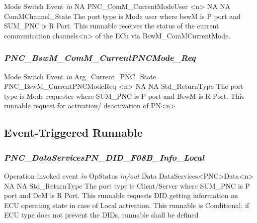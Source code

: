 {Mode Switch Event}
{ \textit{in} \hspace*{1.5in} \vrule \hspace*{0.1in} NA}
{PNC_ComM_CurrentModeUser <n>}
{NA}
{NA}
{ComMChannel_State}
{The port type is Mode user where bswM is P port and SUM_PNC is R Port. This runnable receives the status of the current communication channels<n> of the ECu  via BswM_ComMCurrentMode.}

{}

\subsubsection{\textit{PNC_BswM_ComM_CurrentPNCMode_Req}}

{Mode Switch Event}
{\textit{in} \hspace*{1.5in} \vrule \hspace*{0.1in} Arg_Current_PNC_State}
{PNC_BswM_CurrentPNCModeReq <n>}
{NA}
{NA}
{Std_ReturnType}
{The port type is Mode requester where SUM_PNC is P port and BswM is R Port. This runnable request for activation/ deactivation of PN<n>}

{ }

\subsection{Event-Triggered Runnable}
\label{subsec:EventTriggeredRunnable}

\subsubsection{\textit{PNC_DataServicesPN_DID_F08B_Info_Local}}

{Operation invoked event}
{\textit{in} \hspace*{1.45in} \vrule \hspace*{0.1in} OpStatus \newline \textit{in/out} \hspace*{1.2in} \vrule \hspace*{0.1in} Data}
{DataServices<PNC>Data<n>}
{NA}
{NA}
{Std_ReturnType}
{The port type is Client/Server where SUM_PNC is P port and DcM is R Port. This runnable requests DID getting information on ECU operating state in case of Local activation. This runnable is Conditional: if ECU type does not prevent the DIDs, runnable shall be defined}

